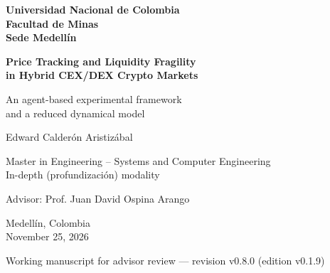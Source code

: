 \documentclass[11pt,letterpaper]{report}
\newcommand{\versionTesis}{v0.1.9}
\newcommand{\revisionManuscrito}{v0.8.0}
\numberwithin{equation}{chapter}
\begin{document}
\begin{titlepage}
  \thispagestyle{empty}
  \centering
  \singlespacing
  {\large\bfseries Universidad Nacional de Colombia\\[2pt]
  Facultad de Minas\\[2pt]
  Sede Medellín\par}
  \vspace{3.2cm}
  {\LARGE\bfseries Price Tracking and Liquidity Fragility\\
  in Hybrid CEX/DEX Crypto Markets\par}
  \vspace{0.9cm}
  {\Large An agent-based experimental framework\\
  and a reduced dynamical model\par}
  \vspace{2.6cm}
  {\Large Edward Calderón Aristizábal\par}
  \vspace{1.6cm}
  {\large Master in Engineering -- Systems and Computer Engineering\\[2pt]
  In-depth (profundización) modality\par}
  \vspace{0.8cm}
  {\large Advisor: Prof. Juan David Ospina Arango\par}
  \vfill
  {\large Medellín, Colombia\\[2pt]
  November 25, 2026\par}
  \vspace{0.3cm}
  {\small Working manuscript for advisor review --- revision \revisionManuscrito{} (edition \versionTesis{})\par}
\end{titlepage}

\setcounter{page}{1}

\begingroup
\setcounter{secnumdepth}{-1}
\titleformat{\section}{\Large\bfseries}{}{0pt}{}
\singlespacing

\clearpage

\endgroup
\setcounter{secnumdepth}{2}
\end{document}
